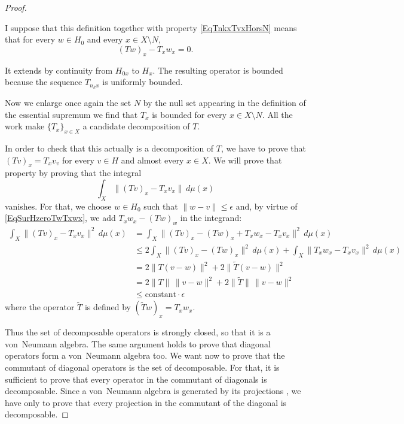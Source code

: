 \begin{proof}
	\begin{probleme}
		I suppose that this definition together with property \eqref{EqTnkxTvxHorsN} means that for every $w\in H_0$ and every $x\in X\setminus N$,
		\begin{equation}			\label{EqSurHzeroTwTxwx}
			(Tw)_x-T_xw_x=0.
		\end{equation}
	\end{probleme}

	It extends by continuity from $H_{0x}$ to $H_x$. The resulting operator is bounded because the sequence $T_{n_kx}$ is uniformly bounded.

	Now we enlarge once again the set $N$ by the null set appearing in the definition of the essential supremum we find that $T_x$ is bounded for every $x\in X\setminus N$. All the work make $\{ T_x \}_{x\in X}$ a candidate decomposition of $T$.

	In order to check that this actually is a decomposition of $T$, we have to prove that $(Tv)_x=T_xv_v$ for every $v\in H$ and almost every $x\in X$. We will prove that property by proving that the integral
	\begin{equation}
		\int_X\| (Tv)_x-T_xv_x \|\,d\mu(x)
	\end{equation}
	vanishes. For that, we choose $w\in H_0$ such that $\| w-v \|\leq\epsilon$ and, by virtue of \eqref{EqSurHzeroTwTxwx}, we add $T_xw_x-(Tw)_w$ in the integrand:
	\begin{equation}
		\begin{split}
			\int_X\| (Tv)_x-T_xv_x \|^2\,d\mu(x)	&= \int_X\| (Tv)_x -(Tw)_x+T_xw_x -T_xv_x \|^2\,d\mu(x)\\
								&\leq 2\int_X\| (Tv)_x-(Tw)_x\|^2\,d\mu(x)+\int_X\| T_xw_x-T_xv_x\|^2\,d\mu(x)\\
								&=2\| T(v-w) \|^2+2\| \tilde T(v-w) \|^2\\
								&=2\| T \|\,\| v-w \|^2 + 2\| \tilde T \|\,\| v-w \|^2\\
								&\leq \text{constant}\cdot \epsilon
		\end{split}
	\end{equation}
	where the operator $\tilde T$ is defined by $(\tilde Tw)_x=T_xw_x$.


	Thus the set of decomposable operators is strongly closed, so that it is a von~Neumann algebra. The same argument holds to prove that diagonal operators form a von~Neumann algebra too. We want now to prove that the commutant of diagonal operators is the set of decomposable. For that, it is sufficient to prove that every operator in the commutant of diagonals is decomposable. Since a von~Neumann algebra is generated by its projections , we have only to prove that every projection in the commutant of the diagonal is decomposable.


\end{proof}
